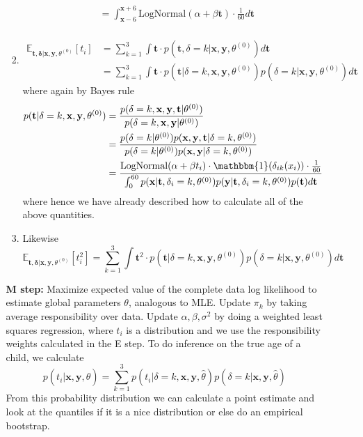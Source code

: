 \documentclass{article}
\begin{document}
\begin{itemize}
\begin{enumerate}[label=(\alph*)]
\begin{enumerate}[label=(\arabic*)]
\begin{align*}
            &=  \int_{\mathbf{x} - 6}^{\mathbf{x} + 6}\text{LogNormal}(\alpha + \beta \mathbf{t}) \cdot \frac{1}{60} d\mathbf{t} \\
          \end{align*}
        \item
          \begin{align*}
            \mathbb{E}_{\mathbf{t}, \mathbf{\delta} | \mathbf{x}, \mathbf{y}, \theta^{(0)}}[t_i] &= \sum_{k=1}^{3}\int \mathbf{t} \cdot p(\mathbf{t}, \delta = k| \mathbf{x}, \mathbf{y}, \theta^{(0)}) d\mathbf{t}\\
            &= \sum_{k=1}^{3}\int \mathbf{t} \cdot p(\mathbf{t}| \delta = k, \mathbf{x}, \mathbf{y}, \theta^{(0)}) p(\delta = k | \mathbf{x}, \mathbf{y}, \theta^{(0)}) d\mathbf{t}
          \end{align*}
          where again by Bayes rule
          \begin{align*}
            p(\mathbf{t}| \delta = k, \mathbf{x}, \mathbf{y}, \theta^{(0)}) &= \frac{p(\delta = k, \mathbf{x}, \mathbf{y}, \mathbf{t} | \theta^{(0)})}{p(\delta = k, \mathbf{x}, \mathbf{y} | \theta^{(0)})} \\
            &= \frac{p(\delta = k | \theta^{(0)}) p( \mathbf{x}, \mathbf{y}, \mathbf{t} | \delta = k, \theta^{(0)})}{p(\delta = k| \theta^{(0)}) p( \mathbf{x}, \mathbf{y} | \delta=k, \theta^{(0)})} \\
            &= \frac{\text{LogNormal}(\alpha + \beta t_i) \cdot \mathbbm{1}(\delta_{ik}(x_i))\cdot \frac{1}{60}}{\int_{0}^{60} p( \mathbf{x} | \mathbf{t}, \delta_i = k,  \theta^{(0)}) p( \mathbf{y} | \mathbf{t}, \delta_i = k,  \theta^{(0)}) p( \mathbf{t})  d\mathbf{t}}
          \end{align*}
          where hence we have already described how to calculate all of the above quantities.
        \item Likewise
          $$\mathbb{E}_{\mathbf{t}, \mathbf{\delta} | \mathbf{x}, \mathbf{y}, \theta^{(0)}}[t_i^2] = \sum_{k=1}^{3}\int \mathbf{t}^2 \cdot p(\mathbf{t}| \delta = k, \mathbf{x}, \mathbf{y}, \theta^{(0)}) p(\delta = k | \mathbf{x}, \mathbf{y}, \theta^{(0)})d\mathbf{t} $$
      \end{enumerate}

      \textbf{M step:} Maximize expected value of the complete data log likelihood to estimate global parameters $\theta$, analogous to MLE.
      Update $\pi_k$ by taking average responsibility over data. Update $\alpha, \beta, \sigma^2$ by doing a weighted least squares regression, where $t_i$ is a distribution and we use the responsibility weights calculated in the E step.
      To do inference on the true age of a child, we calculate
      \[p(t_i| \mathbf{x}, \mathbf{y}, \hat{\theta}) = \sum_{k=1}^{3} p(t_i| \delta=k, \mathbf{x}, \mathbf{y}, \hat{\theta}) p(\delta=k| \mathbf{x}, \mathbf{y}, \hat{\theta})  \]
      From this probability distribution we can calculate a point estimate and look at the quantiles if it is a nice distribution or else do an empirical bootstrap.
  \end{enumerate}

\end{itemize}
\end{document}
